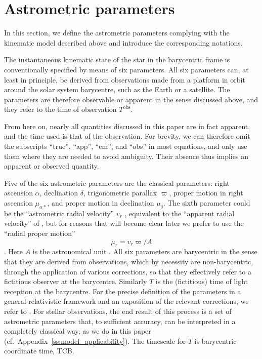 \documentclass{aa}
\begin{document}
\section{Astrometric parameters}\label{s:astr_params}

In this section, we define the astrometric parameters complying with the
kinematic model described above and introduce the corresponding
notations.

The instantaneous kinematic state of the star in the
barycentric frame is conventionally specified by means of six parameters. All
six parameters can, at least in principle, be derived from observations made
from a platform in orbit around the solar system barycentre, such as the Earth
or a satellite. The parameters are therefore observable or apparent in the sense
discussed above, and they refer to the time of observation $T^\mathrm{obs}$.

From here on, nearly all quantities discussed in this paper are in fact apparent,
and the time used is that of the observation. For brevity, we can therefore
omit the subscripts ``true'', ``app'', ``em'', and ``obs'' in most equations,
and only use them where they are needed to avoid ambiguity. Their absence
thus implies an apparent or observed quantity.

Five of the six astrometric parameters are the classical parameters:
right ascension $\alpha$, declination $\delta$, trigonometric parallax $\varpi$,
proper motion in right ascension $\mu_{\alpha*}$, and proper motion in declination
$\mu_\delta$. The sixth parameter could be the ``astrometric radial velocity'' $v_r$
\citep{lindegren_dravins2003}, equivalent to the ``apparent radial velocity'' of \citet{klioner2003},
but for reasons that will become clear later we prefer to use the ``radial proper motion''
\begin{equation}\label{eq:mur}
\mu_r = v_r\varpi/A
\end{equation}
\citep{lindegrenAGIS2012}. Here $A$ is the astronomical unit \citep{iau2012B2}.
All six parameters are barycentric in the sense that they are derived from observations,
which by necessity are non-barycentric, through the application of various corrections, so that
they effectively refer to a fictitious observer at the barycentre.
Similarly $T$ is the (fictitious) time
of light reception at the barycentre. For the precise definition of the parameters in a
general-relativistic framework and an exposition of the relevant corrections, we refer to
\citet{klioner2003}. For stellar observations, the end result of this process is a set of astrometric
parameters that, to sufficient accuracy, can be interpreted in a completely classical way, as we
do in this paper (cf.\ Appendix~\ref{ss:model_applicability}). The timescale for $T$ is barycentric coordinate time, TCB.
\end{document}
